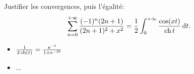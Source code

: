 \begin{exercice}    
    Justifier les convergences, puis l'égalité:
    $$\sum_{n=0}^{+ \infty} \frac{(-1)^n (2n+1)}{(2n+1)^2 + x^2} = \frac{1}{2} \int_{0}^{+ \infty} \frac{\cos (xt)}{\operatorname{ch} t} \, \mathrm{d} t.$$
\end{exercice}

\begin{elem_sol}
    \begin{itemize}
        \item $\frac{1}{2 \operatorname{ch}(t)} = \frac{\mathrm{e}^{-t}}{1 + \mathrm{e}^{-2t}}$
        \item ...
    \end{itemize}
\end{elem_sol}
